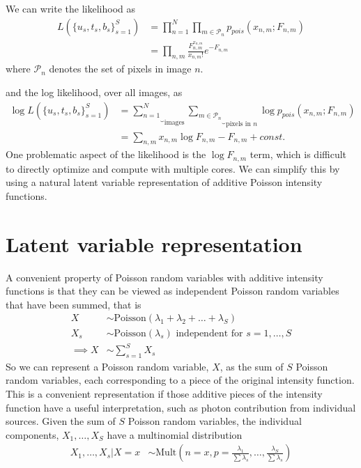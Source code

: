 \documentclass[11pt]{article}
\begin{document}
We can write the likelihood as 
\begin{align}
   L(\{u_s, t_s, b_s\}_{s=1}^S)
     &= \prod_{n=1}^N \prod_{m \in \mathcal{P}_n} p_{pois}(x_{n,m} ; F_{n,m}) \\
     &= \prod_{n,m} \frac{ F_{n,m}^{x_{n,m}}}{x_{n,m}!} e^{-F_{n,m}}
\end{align}
where $\mathcal{P}_n$ denotes the set of pixels in image $n$.  

and the log likelihood, over all images, as 
\begin{align}
  \log L(\{u_s, t_s, b_s\}_{s=1}^S) 
    &= \underbrace{\sum_{n=1}^N}_{\text{images}}
       \underbrace{\sum_{m \in \mathcal{P}_n}}_{\text{pixels in $n$}}
       \log p_{pois}(x_{n,m}; F_{n,m}) \\
    &= \sum_{n,m} x_{n,m} \log F_{n,m} - F_{n,m} + const.
\end{align}
One problematic aspect of the likelihood is the $\log F_{n,m}$ term, which is difficult to directly optimize and compute with multiple cores.  We can simplify this by using a natural latent variable representation of additive Poisson intensity functions.  

\section{Latent variable representation}
A convenient property of Poisson random variables with additive intensity functions is that they can be viewed as independent Poisson random variables that have been summed, that is
\begin{align}
  X &\sim \textrm{Poisson}(\lambda_1 + \lambda_2 + \dots + \lambda_S) \\
  X_s &\sim \textrm{Poisson}(\lambda_s) \text{ independent for } s = 1, \dots, S \\
  \implies
  X &\sim \sum_{s=1}^S X_s
\end{align}
So we can represent a Poisson random variable, $X$, as the sum of $S$ Poisson random variables, each corresponding to a piece of the original intensity function.  This is a convenient representation if those additive pieces of the intensity function have a useful interpretation, such as photon contribution from individual sources.  Given the sum of $S$ Poisson random variables, the individual components, $X_1, \dots, X_S$ have a multinomial distribution 
\begin{align}
  X_1, \dots, X_s | X=x &\sim \textrm{Mult}\left(n=x, p= \frac{\lambda_1}{\sum \lambda_s}, \dots, \frac{\lambda_S}{\sum \lambda_s} \right) 
\end{align}
\end{document}
